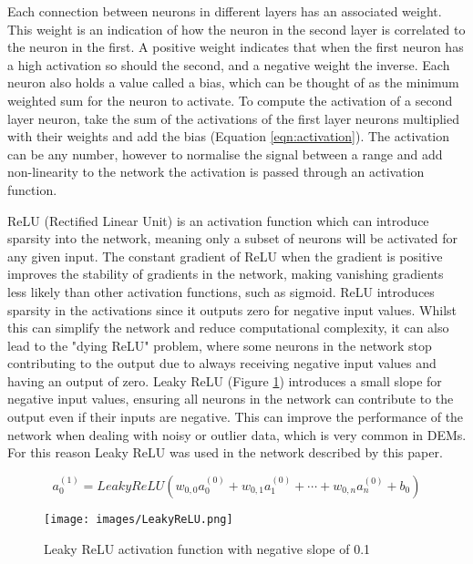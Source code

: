 \documentclass[twocolumn]{article}
\begin{document}
Each connection between neurons in different layers has an associated weight.
This weight is an indication of how the neuron in the second layer is correlated to the neuron in the first.
A positive weight indicates that when the first neuron has a high activation so should the second, and a negative weight the inverse.
Each neuron also holds a value called a bias, which can be thought of as the minimum weighted sum for the neuron to activate.
To compute the activation of a second layer neuron, take the sum of the activations of the first layer neurons multiplied with their weights and add the bias (Equation \ref{eqn:activation}).
The activation can be any number, however to normalise the signal between a range and add non-linearity to the network the activation is passed through an activation function.

ReLU (Rectified Linear Unit) is an activation function which can introduce sparsity into the network, meaning only a subset of neurons will be activated for any given input.
The constant gradient of ReLU when the gradient is positive improves the stability of gradients in the network, making vanishing gradients less likely than other activation functions, such as sigmoid.
ReLU introduces sparsity in the activations since it outputs zero for negative input values.
Whilst this can simplify the network and reduce computational complexity, it can also lead to the "dying ReLU" problem, where some neurons in the network stop contributing to the output due to always receiving negative input values and having an output of zero.
Leaky ReLU (Figure \ref{fig:LeakyReLU}) introduces a small slope for negative input values, ensuring all neurons in the network can contribute to the output even if their inputs are negative.
This can improve the performance of the network when dealing with noisy or outlier data, which is very common in DEMs.
For this reason Leaky ReLU was used in the network described by this paper.

\begin{equation}
\label{eqn:activation}
a^{(1)}_0 = LeakyReLU(w_{0,0}a^{(0)}_0 + w_{0,1}a^{(0)}_1 + \cdots + w_{0,n}a^{(0)}_n + b_0)
\end{equation}

\begin{figure}[htbp]
\centering
\texttt{[image: images/LeakyReLU.png]}
\caption{\label{fig:LeakyReLU}Leaky ReLU activation function with negative slope of 0.1}
\end{figure}
\end{document}
